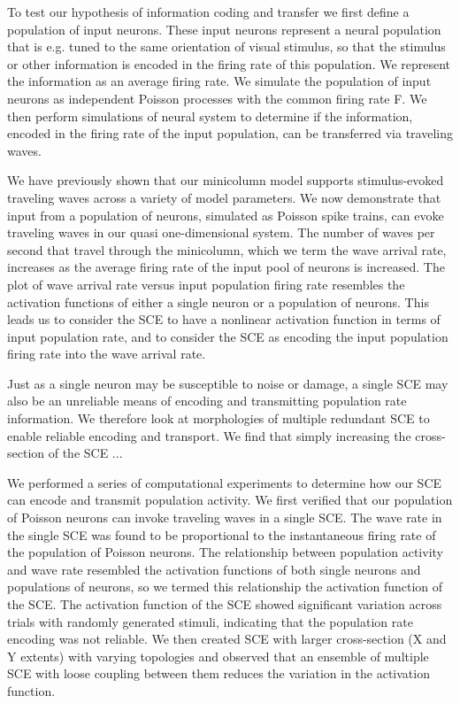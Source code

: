 To test our hypothesis of information coding and transfer we first define a population of input neurons.
These input neurons represent a neural population that is e.g. tuned to the same orientation of visual stimulus, 
so that the stimulus or other information is encoded in the firing rate of this population.
We represent the information as an average firing rate.
We simulate the population of input neurons as independent Poisson processes with the common firing rate F.
We then perform simulations of neural system to determine if the information, encoded in the firing rate of the input population,
can be transferred via traveling waves.

We have previously shown that our minicolumn model supports stimulus-evoked traveling waves across a variety of model parameters.
We now demonstrate that input from a population of neurons, simulated as Poisson spike trains, can evoke traveling waves in our quasi one-dimensional system.
The number of waves per second that travel through the minicolumn, which we term the wave arrival rate, increases as the average firing rate of the input pool of neurons is increased.
The plot of wave arrival rate versus input population firing rate resembles the activation functions of either a single neuron or a population of neurons.
This leads us to consider the SCE to have a nonlinear activation function in terms of input population rate, and to consider the SCE as encoding the input population firing rate into the wave arrival rate.

Just as a single neuron may be susceptible to noise or damage, a single SCE may also be an unreliable means of encoding and transmitting population rate information.
We therefore look at morphologies of multiple redundant SCE to enable reliable encoding and transport.
We find that simply increasing the cross-section of the SCE ...

We performed a series of computational experiments to determine how our SCE can encode and transmit population activity.
We first verified that our population of Poisson neurons can invoke traveling waves in a single SCE.
The wave rate in the single SCE was found to be proportional to the instantaneous firing rate of the population of Poisson neurons.
The relationship between population activity and wave rate resembled the activation functions of both single neurons and populations of neurons, so we termed this relationship the activation function of the SCE.
The activation function of the SCE showed significant variation across trials with randomly generated stimuli, indicating that the population rate encoding was not reliable.
We then created SCE with larger cross-section (X and Y extents) with varying topologies and observed that an ensemble of multiple SCE with loose coupling between them reduces the variation in the activation function.


